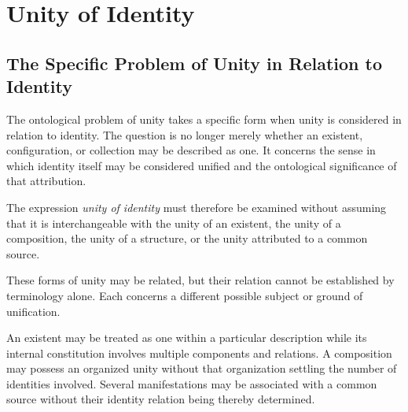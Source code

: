 %
%
%
%
%

\section{Unity of Identity}
\label{sec:unity-of-identity}

\subsection{The Specific Problem of Unity in Relation to Identity}

The ontological problem of unity takes a specific form
when unity is considered in relation to identity.
The question is no longer merely whether an existent,
configuration, or collection may be described as one.
It concerns the sense in which identity itself may be
considered unified and the ontological significance
of that attribution.

The expression \emph{unity of identity} must therefore
be examined without assuming that it is interchangeable
with the unity of an existent, the unity of a composition,
the unity of a structure, or the unity attributed to
a common source.

These forms of unity may be related, but their relation
cannot be established by terminology alone. Each
concerns a different possible subject or ground of
unification.

An existent may be treated as one within a particular
description while its internal constitution involves
multiple components and relations. A composition may
possess an organized unity without that organization
settling the number of identities involved. Several
manifestations may be associated with a common source
without their identity relation being thereby determined.

